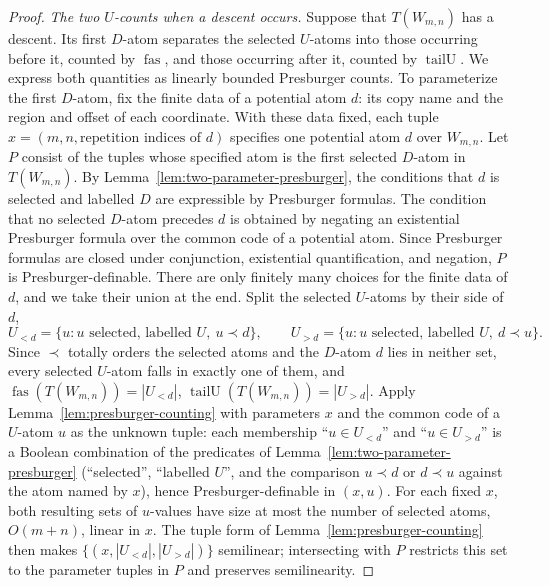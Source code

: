 \documentclass[11pt]{article}
\theoremstyle{definition}
\newcommand{\fas}{\operatorname{fas}}
\newcommand{\tailU}{\operatorname{tailU}}
\begin{document}
\begin{proof}
\vspace{0.5em}
\noindent\emph{The two $U$-counts when a descent occurs.}  Suppose that
$T(W_{m,n})$ has a descent.  Its first $D$-atom separates the selected
$U$-atoms into those occurring before it, counted by $\fas$, and those
occurring after it, counted by $\tailU$.  We express both quantities as
linearly bounded Presburger counts.  To parameterize the first $D$-atom, fix
the finite data of a potential atom $d$: its copy name and the region and offset
of each coordinate.  With these data fixed, each tuple
$x=(m,n,\text{repetition indices of }d)$ specifies one potential atom $d$ over
$W_{m,n}$.  Let $P$ consist of the tuples whose specified atom is the first
selected $D$-atom in $T(W_{m,n})$.  By
Lemma~\ref{lem:two-parameter-presburger}, the conditions that $d$ is selected
and labelled $D$ are expressible by Presburger formulas.  The condition that
no selected $D$-atom precedes $d$ is obtained by negating an existential
Presburger formula over the common code of a potential atom.  Since Presburger
formulas are closed under conjunction, existential quantification, and
negation, $P$ is Presburger-definable.  There are only finitely many choices for the finite data
of $d$, and we take their union at the end.  Split the selected $U$-atoms by
their side of $d$,
\[
   U_{<d}=\{u:u\text{ selected, labelled }U,\ u\prec d\},\qquad
   U_{>d}=\{u:u\text{ selected, labelled }U,\ d\prec u\}.
\]
Since $\prec$ totally orders the selected atoms and the $D$-atom $d$ lies in
neither set, every selected $U$-atom falls in exactly one of them, and
$\fas(T(W_{m,n}))=|U_{<d}|$, $\tailU(T(W_{m,n}))=|U_{>d}|$.  Apply
Lemma~\ref{lem:presburger-counting} with parameters $x$ and the common code of
a $U$-atom $u$ as the unknown tuple: each membership ``$u\in U_{<d}$'' and
``$u\in U_{>d}$'' is a Boolean combination of the predicates of
Lemma~\ref{lem:two-parameter-presburger} (``selected'', ``labelled $U$'', and the
comparison $u\prec d$ or $d\prec u$ against the atom named by $x$), hence
Presburger-definable in $(x,u)$.  For each fixed $x$, both resulting sets of
$u$-values have size at most the number of selected atoms, $O(m+n)$, linear in
$x$.  The tuple form of
Lemma~\ref{lem:presburger-counting} then makes $\{(x,|U_{<d}|,|U_{>d}|)\}$
semilinear; intersecting with $P$ restricts this set to the parameter tuples in
$P$ and preserves semilinearity.


\end{proof}
\end{document}

